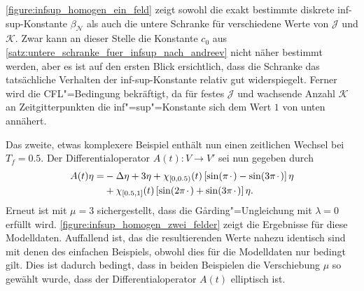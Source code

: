 \documentclass[../main.tex]{subfiles}
\begin{document}
\cref{figure:infsup_homogen_ein_feld} zeigt sowohl die exakt bestimmte diskrete inf-sup-Konstante $\beta_{\mathcal N}$ als auch die untere Schranke für verschiedene Werte von $\mathcal J$ und $\mathcal K$.
Zwar kann an dieser Stelle die Konstante $c_{0}$ aus \cref{satz:untere_schranke_fuer_infsup_nach_andreev} nicht näher bestimmt werden, aber es ist auf den ersten Blick ersichtlich, dass die Schranke das tatsächliche Verhalten der inf-sup-Konstante relativ gut widerspiegelt.
Ferner wird die CFL"=Bedingung bekräftigt, da für festes $\mathcal J$ und wachsende Anzahl $\mathcal K$ an Zeitgitterpunkten die inf"=sup"=Konstante sich dem Wert $1$ von unten annähert.

Das zweite, etwas komplexere Beispiel enthält nun einen zeitlichen Wechsel bei $T_{f} = 0.5$.
Der Differentialoperator $A(t) \colon V \to V'$ sei nun gegeben durch
\begin{equation}
    \begin{aligned}
        A(t)\eta =
        &- \Delta \eta + 3 \eta + \chi_{[0, 0.5)}(t) \left[ \sin(\pi {\mkern2mu\cdot\mkern2mu}) - \sin(3 \pi {\mkern2mu\cdot\mkern2mu}) \right] \eta
        \\&+ \chi_{[0.5, 1]}(t) \left[ \sin(2 \pi {\mkern2mu\cdot\mkern2mu} ) + \sin(3 \pi {\mkern2mu\cdot\mkern2mu}) \right] \eta.
    \end{aligned}
\end{equation}
Erneut ist mit $\mu = 3$ sichergestellt, dass die G\aa{}rding"=Ungleichung mit $\lambda = 0$ erfüllt wird.
\cref{figure:infsup_homogen_zwei_felder} zeigt die Ergebnisse für diese Modelldaten.
Auffallend ist, das die resultierenden Werte nahezu identisch sind mit denen des einfachen Beispiels, obwohl dies für die Modelldaten nur bedingt gilt.
Dies ist dadurch bedingt, dass in beiden Beispielen die Verschiebung $\mu$ so gewählt wurde, dass der Differentialoperator $A(t)$ elliptisch ist.
\end{document}

